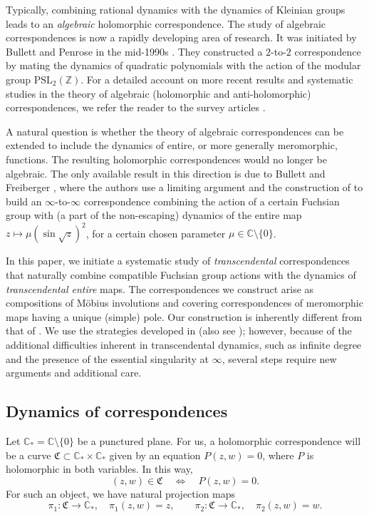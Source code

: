 \documentclass[11pt,a4paper, oneside]{amsart}
\theoremstyle{definition}
\theoremstyle{remark}
\numberwithin{equation}{section}
\newcommand{\C}{\mathbb{C}}
\newcommand{\sm}{\setminus}
\begin{document}
Typically, combining rational dynamics with the dynamics of Kleinian groups leads to an \emph{algebraic} holomorphic correspondence. The study of algebraic correspondences is now a rapidly developing area of research. It was initiated by Bullett and Penrose in the mid-1990s \cite{BP}. They constructed a $2$-to-$2$ correspondence by mating the dynamics of quadratic polynomials with the action of the modular group $\mathrm{PSL}_2(\mathbb Z)$.
For a detailed account on more recent results and systematic studies in the theory of algebraic (holomorphic and anti-holomorphic) correspondences, we refer the reader to the survey articles \cite{LM26b,ICMSurvey}.

A natural question is whether the theory of algebraic correspondences can be extended to include the dynamics of entire, or more generally meromorphic, functions. The resulting holomorphic correspondences would no longer be algebraic. The only available result in this direction is due to Bullett and Freiberger \cite{BF}, where the authors use a limiting argument and the construction of \cite{BP} to build an $\infty$-to-$\infty$ correspondence combining the action of a certain Fuchsian group with (a part of the non-escaping) dynamics of the entire map $z \mapsto \mu \left(\sin \sqrt{z}\right)^2$, for a certain chosen parameter $\mu \in \mathbb C \setminus \{0\}$. 

In this paper, we initiate a systematic study of \emph{transcendental} correspondences that naturally combine compatible Fuchsian group actions with the dynamics of \emph{transcendental entire} maps. The correspondences we construct arise as compositions of M{\"o}bius involutions and covering correspondences of meromorphic maps having a unique (simple) pole. Our construction is inherently different from that of \cite{BF}. We use the strategies developed in \cite{LLM24,BLLM} (also see \cite{MV25}); however, because of the additional difficulties inherent in transcendental dynamics, such as infinite degree and the presence of the essential singularity at $\infty$, several steps require new arguments and additional care.

\subsection{Dynamics of correspondences}


Let $\C_* = \C \sm \{0\}$ be a punctured plane. For us, a holomorphic correspondence will be a curve $\mathfrak{C} \subset \C_* \times \C_*$ given by an equation $P(z,w)=0$, where $P$ is holomorphic in both variables. In this way, 
\[
(z,w) \in \mathfrak C \quad \Longleftrightarrow \quad P(z,w)=0.
\]
For such an object, we have natural projection maps
\[
\pi_1 \colon \mathfrak{C} \to \mathbb C_*, \quad \pi_1(z,w)=z,\qquad \pi_2 \colon \mathfrak{C} \to \mathbb C_*, \quad \pi_2(z,w)=w.
\]
\end{document}
